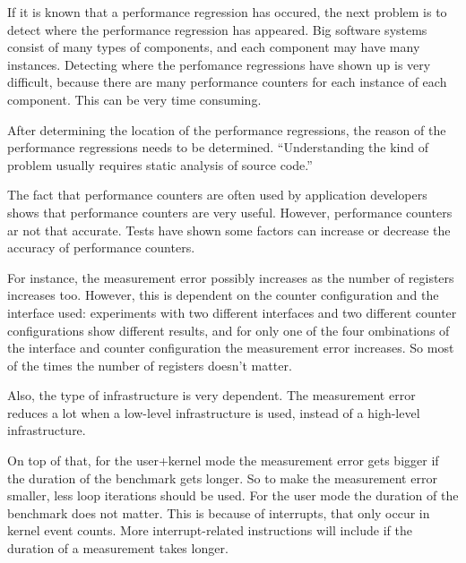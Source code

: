 If it is known that a performance regression has occured, the next problem is to detect where the performance regression has appeared. Big software systems consist of many types of components, and each component may have many instances. Detecting where the perfomance regressions have shown up is very difficult, because there are many performance counters for each instance of each component. This can be very time consuming.

After determining the location of the performance regressions, the reason of the performance regressions needs to be determined. ``Understanding the kind of problem usually requires static analysis of source code.'' \cite{nguyen2012using}

The fact that performance counters are often used by application developers shows that performance counters are very useful. However, performance counters ar not that accurate. Tests have shown some factors can increase or decrease the accuracy of performance counters.

For instance, the measurement error possibly increases as the number of registers increases too. However, this is dependent on the counter configuration and the interface used: experiments with two different interfaces and two different counter configurations show different results, and for only one of the four ombinations of the interface and counter configuration the measurement error increases. \cite{AccuracyPerforanceCounter} So most of the times the number of registers doesn't matter.

Also, the type of infrastructure is very dependent. The measurement error reduces a lot when a low-level infrastructure is used, instead of a high-level infrastructure. \cite{AccuracyPerformanceCounter}

On top of that, for the user+kernel mode the measurement error gets bigger if the duration of the benchmark gets longer. \cite{AccuracyPerformanceCounter} So to make the measurement error smaller, less loop iterations should be used.  For the user mode the duration of the benchmark does not matter. This is because of interrupts, that only occur in kernel event counts. More interrupt-related instructions will include if the duration of a measurement takes longer.

